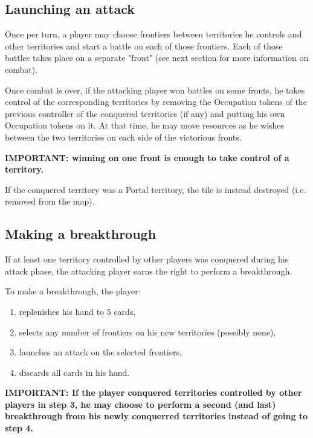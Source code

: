 \documentclass[a4paper]{article}
\begin{document}
\subsection{Launching an attack}

    Once per turn, a player may choose frontiers between territories he controls and other
    territories and start a battle on each of those frontiers.
    Each of those battles takes place on a separate "front"
    (see next section for more information on combat).

    Once combat is over, if the attacking player won battles on some fronts,
    he takes control of the corresponding territories by removing the Occupation tokens of
    the previous controller of the conquered territories (if any) and putting his own
    Occupation tokens on it.
    At that time, he may move resources as he wishes between the two territories on each side
    of the victorious fronts.
    
    \hspace{-1.5em} \textbf{
    IMPORTANT: winning on one front is enough to take control of a territory.
    }

    If the conquered territory was a Portal territory, the tile is instead destroyed
    (i.e. removed from the map).


\subsection{Making a breakthrough}

    If at least one territory controlled by other players was conquered during his attack phase,
    the attacking player earns the right to perform a breakthrough.

    \hspace{-1.5em} To make a breakthrough, the player:
    \vspace{-1.3em}
    \begin{enumerate}
        \item replenishes his hand to 5 cards,
        \item selects any number of frontiers on his new territories (possibly none),
        \item launches an attack on the selected frontiers,
        \item discards all cards in his hand.
    \end{enumerate}
    
    \vspace{-0.7em}
    \hspace{-1.5em} \textbf{
    IMPORTANT: If the player conquered territories controlled by other players in step 3,
    he may choose to perform a second
    (and last) breakthrough from his newly conquerred territories instead of going to step 4.
    }
    
\end{document}
